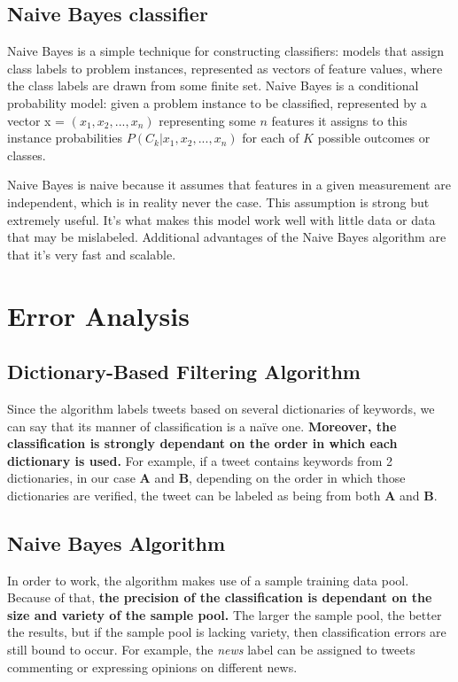 \documentclass{article}
\begin{document}
\subsection{Naive Bayes classifier}

\large
{
\quad
Naive Bayes is a simple technique for constructing
classifiers: models that assign class labels to problem
instances, represented as vectors of feature values, where the
class labels are drawn from some finite set. Naive Bayes is
a conditional probability model: given a problem instance to
be classified, represented by a vector x =
$(x_1, x_2, ..., x_n)$ representing some $n$ features it assigns to this
instance probabilities
$P(C_k | x_1, x_2, ..., x_n)$ for each of $K$ possible outcomes or
classes.

Naive Bayes is naive because it assumes that features in a given measurement are independent, which is in reality never the case. This assumption is strong but extremely useful. It’s what makes this model work well with little data or data that may be mislabeled. Additional advantages of the Naive Bayes algorithm are that it’s very fast and scalable.\cite{naive_property}
}

\section{Error Analysis}

\subsection{Dictionary-Based Filtering Algorithm}
\large
{
\quad
Since the algorithm labels tweets based on several dictionaries of keywords, we can say that its manner of classification is a naïve one. \textbf{Moreover, the classification is strongly dependant on the order in which each dictionary is used.} For example, if a tweet contains keywords from 2 dictionaries, in our case \textbf{A} and \textbf{B}, depending on the order in which those dictionaries are verified, the tweet can be labeled as being from both \textbf{A} and \textbf{B}. 
}

\subsection{Naive Bayes Algorithm}
\large
{
\quad
In order to work, the algorithm makes use of a sample training data pool. Because of that, \textbf{the precision of the classification is dependant on the size and variety of the sample pool.} The larger the sample pool, the better the results, but if the sample pool is lacking variety, then classification errors are still bound to occur. For example, the \textit{news} label can be assigned to tweets commenting or expressing opinions on different news.
}
\end{document}
